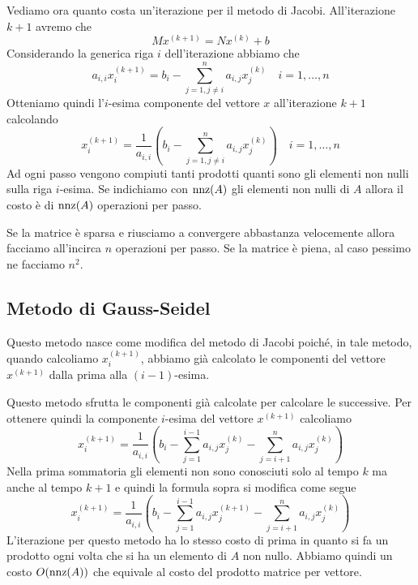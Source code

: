 Vediamo ora quanto costa un'iterazione per il metodo di Jacobi. All'iterazione $k+1$ avremo che
\[ M x^{(k+1)} = N x^{(k)} + b \]
Considerando la generica riga $i$ dell'iterazione abbiamo che
\[ a_{i,i} x^{(k+1)}_i = b_i - \sum_{j=1, j \neq i}^n a_{i,j} x_j^{(k)} \quad i= 1, \dots, n \]
Otteniamo quindi l'$i$-esima componente del vettore $x$ all'iterazione $k+1$ calcolando
\[
	x^{(k+1)}_i =
	\frac{1}{a_{i,i}} \left( b_i - \sum_{j=1, j \neq i}^{n} a_{i,j} x_j^{(k)} \right) \quad i=1,\dots, n
\]
Ad ogni passo vengono compiuti tanti prodotti quanti sono gli elementi non nulli sulla riga $i$-esima. Se
indichiamo con $\operatorname{nnz}(A)$ gli elementi non nulli di $A$ allora il costo è di $\operatorname{nnz}(A)$ operazioni per passo.

Se la matrice è sparsa e riusciamo a convergere abbastanza velocemente allora facciamo all'incirca $n$ operazioni
per passo. Se la matrice è piena, al caso pessimo ne facciamo $n^2$.

\subsection{Metodo di Gauss-Seidel}
Questo metodo nasce come modifica del metodo di Jacobi poiché, in tale metodo, quando calcoliamo $x^{(k+1)}_i$,
abbiamo già calcolato le componenti del vettore $x^{(k+1)}$ dalla prima alla $(i-1)$-esima.

Questo metodo sfrutta le componenti già calcolate per calcolare le successive. Per ottenere quindi la componente
$i$-esima del vettore $x^{(k+1)}$ calcoliamo
\[
	x^{(k+1)}_i =
	\frac{1}{a_{i,i}} \left( b_i - \sum_{j=1}^{i-1} a_{i,j} x^{(k)}_j -
	\sum_{j=i+1}^{n} a_{i,j} x^{(k)}_j \right)
\]
Nella prima sommatoria gli elementi non sono conosciuti solo al tempo $k$ ma anche al tempo $k+1$ e quindi la
formula sopra si modifica come segue
\[
	x^{(k+1)}_i =
	\frac{1}{a_{i,i}} \left( b_i - \sum_{j=1}^{i-1} a_{i,j} x^{(k+1)}_j -
	\sum_{j=i+1}^{n} a_{i,j} x^{(k)}_j \right)
\]
L'iterazione per questo metodo ha lo stesso costo di prima in quanto si fa un prodotto ogni volta che si ha un
elemento di $A$ non nullo. Abbiamo quindi un costo $O(\operatorname{nnz}(A))$ che equivale al costo del prodotto matrice per
vettore.
